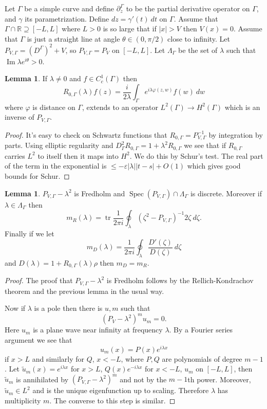 \documentclass[12pt]{report}
\newcommand{\RR}{\mathbb{R}}
\newcommand{\tr}{\operatorname{tr}}
\newcommand{\Spec}{\operatorname{Spec}}
\renewcommand{\Im}{\operatorname{Im}}
\theoremstyle{definition}
\newtheorem{lemma}[theorem]{Lemma}
\begin{document}
Let $\Gamma$ be a simple curve and define $\partial_z^\Gamma$ to be the partial derivative operator on $\Gamma$, and $\gamma$ its parametrization. Define $dz = \gamma'(t)~dt$ on $\Gamma$. Assume that $\Gamma \cap \RR \supseteq [-L, L]$ where $L > 0$ is so large that if $|x| > V$ then $V(x) = 0$.
Assume that $\Gamma$ is just a straight line at angle $\theta \in (0, \pi/2)$ close to infinity.
Let $P_{V,\Gamma} = (D^\Gamma)^2 + V$, so $P_{V,\Gamma} = P_V$ on $[-L, L]$.
Let $\Lambda_\Gamma$ be the set of $\lambda$ such that $\Im \lambda e^{i\theta} > 0$.

\begin{lemma}
If $\lambda \neq 0$ and $f \in C^1_c(\Gamma)$ then
$$R_{0,\Gamma}(\lambda)f(z) = \frac{i}{2\lambda} \int_\Gamma e^{i\lambda\varphi(z, w)} f(w)~dw$$
where $\varphi$ is distance on $\Gamma$, extends to an operator $L^2(\Gamma) \to H^2(\Gamma)$ which is an inverse of $P_{V,\Gamma}$.
\end{lemma}
\begin{proof}
It's easy to check on Schwartz functions that $R_{0,\Gamma} = P_{V,\Gamma}^{-1}$ by integration by parts.
Using elliptic regularity and $D_\Gamma^2R_{0,\Gamma} = 1 + \lambda^2R_{0,\Gamma}$ we see that if $R_{0,\Gamma}$ carries $L^2$ to itself then it maps into $H^2$. We do this by Schur's test.
The real part of the term in the exponential is $\leq -\varepsilon|\lambda||t-s| + O(1)$ which gives good bounds for Schur.
\end{proof}

\begin{lemma}
$P_{V,\Gamma} - \lambda^2$ is Fredholm and $\Spec(P_{V,\Gamma}) \cap \Lambda_\Gamma$ is discrete. Moreover if $\lambda \in \Lambda_\Gamma$ then
$$m_R(\lambda) = \tr\frac{1}{2\pi i}\oint_\lambda (\zeta^2 - P_{V,\Gamma})^{-1}2\zeta~d\zeta.$$
Finally if we let
$$m_D(\lambda) = \frac{1}{2\pi i} \oint_\lambda \frac{D'(\zeta)}{D(\zeta)}~d\zeta$$
and $D(\lambda) = 1 + R_{0,\Gamma}(\lambda)\rho$ then $m_D = m_R$.
\end{lemma}
\begin{proof}
The proof that $P_{V,\Gamma} - \lambda^2$ is Fredholm follows by the Rellich-Kondrachov theorem and the previous lemma in the usual way.

Now if $\lambda$ is a pole then there is $u,m$ such that
$$(P_V - \lambda^2)^m u_m = 0.$$
Here $u_m$ is a plane wave near infinity at frequency $\lambda$. By a Fourier series argument we see that
$$u_m(x) = P(x)e^{i\lambda x}$$
if $x > L$ and similarly for $Q$, $x < -L$, where $P,Q$ are polynomials of degree $m - 1$. Let $\tilde u_m(x) = e^{i\lambda x}$ for $x > L$, $Q(x)e^{-i\lambda x}$ for $x < -L$, $u_m$ on $[-L, L]$, then $\tilde u_m$ is annihilated by $(P_{V,\Gamma} - \lambda^2)^m$ and not by the $m-1$th power. Moreover, $\tilde u_m \in L^2$ and is the unique eigenfunction up to scaling.
Therefore $\lambda$ has multiplicity $m$. The converse to this step is similar.
\end{proof}
\end{document}
